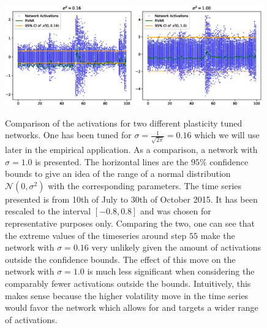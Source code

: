 \begin{figure}
    \begin{center}
        \includegraphics[width=0.49\textwidth]{Plots/network_activation_016.eps}
        \includegraphics[width=0.49\textwidth]{Plots/network_activation_10.eps}
    \end{center}
    \caption{Comparison of the activations for two different plasticity tuned networks. One has been tuned for $\sigma = \frac{1}{\sqrt{2\pi}} = 0.16$ which we will use later in the empirical application. As a comparison, a network with $\sigma = 1.0$ is presented. The horizontal lines are the $95\%$ confidence bounds to give an idea of the range of a normal distribution $\mathcal{N}(0, \sigma^2)$ with the corresponding parameters. The time series presented is from 10th of July to 30th of October 2015. It has been rescaled to the interval $[-0.8, 0.8]$ and was chosen for representative purposes only. Comparing the two, one can see that the extreme values of the timeseries around step $55$ make the network with $\sigma = 0.16$ very unlikely given the amount of activations outside the confidence bounds. The effect of this move on the network with $\sigma = 1.0$ is much less significant when considering the comparably fewer activations outside the bounds. Intuitively, this makes sense because the higher volatility move in the time series would favor the network which allows for and targets a wider range of activations.}
    \label{FIG:NetworkActivations}
\end{figure}

